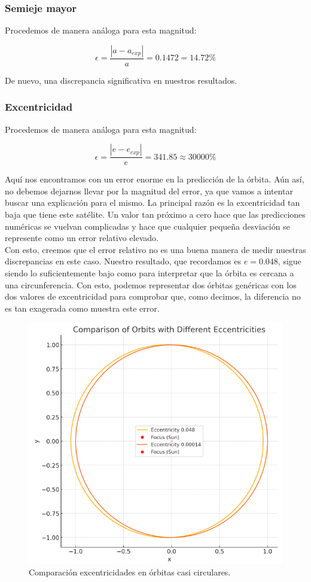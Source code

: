\documentclass{article}
\numberwithin{equation}{section}
\begin{document}
\subsubsection{Semieje mayor}
Procedemos de manera análoga para esta magnitud:

\begin{equation*}
    \epsilon=\frac{\left\lvert a-a_{exp} \right\rvert}{a}=0.1472=14.72\%
\end{equation*}

De nuevo, una discrepancia significativa en nuestros resultados.

\subsubsection{Excentricidad}
Procedemos de manera análoga para esta magnitud:

\begin{equation*}
    \epsilon=\frac{\left\lvert e-e_{exp} \right\rvert}{e}=341.85\approx30000\%
\end{equation*}

Aquí nos encontramos con un error enorme en la predicción de la órbita. Aún así, no debemos dejarnos llevar por la magnitud del error, ya que vamos a intentar buscar una explicación para el mismo. La principal razón es la excentricidad tan baja que tiene este satélite. Un valor tan próximo a cero hace que las predicciones numéricas se vuelvan complicadas y hace que cualquier pequeña desviación se represente como un error relativo elevado.\\

Con esto, creemos que el error relativo no es una buena manera de medir nuestras discrepancias en este caso. Nuestro resultado, que recordamos es $e=0.048$, sigue siendo lo suficientemente bajo como para interpretar que la órbita es cercana a una circunferencia. Con esto, podemos representar dos órbitas genéricas con los dos valores de excentricidad para comprobar que, como decimos, la diferencia no es tan exagerada como muestra este error.

\begin{figure}[h]
    \centering
    \includegraphics[width=0.5\linewidth]{exce.png}
    \caption{Comparación excentricidades en órbitas casi circulares.}
\end{figure}
\end{document}
